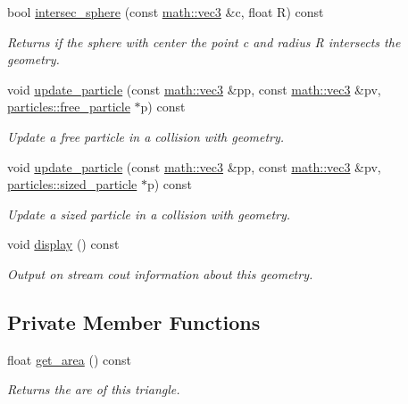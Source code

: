 \begin{DoxyCompactItemize}
bool \hyperlink{classphysim_1_1geometry_1_1triangle_aa5637d5f349e5cd1c774110b26854192}{intersec\+\_\+sphere} (const \hyperlink{structphysim_1_1math_1_1vec3}{math\+::vec3} \&c, float R) const
\begin{DoxyCompactList}\small\item\em Returns if the sphere with center the point {\itshape c} and radius {\itshape R} intersects the geometry. \end{DoxyCompactList}\item 
void \hyperlink{classphysim_1_1geometry_1_1triangle_a85898a3cca36efa410dfe9044619c798}{update\+\_\+particle} (const \hyperlink{structphysim_1_1math_1_1vec3}{math\+::vec3} \&pp, const \hyperlink{structphysim_1_1math_1_1vec3}{math\+::vec3} \&pv, \hyperlink{classphysim_1_1particles_1_1free__particle}{particles\+::free\+\_\+particle} $\ast$p) const
\begin{DoxyCompactList}\small\item\em Update a free particle in a collision with geometry. \end{DoxyCompactList}\item 
void \hyperlink{classphysim_1_1geometry_1_1triangle_a138bc267ef333128534651fa6f20ff2a}{update\+\_\+particle} (const \hyperlink{structphysim_1_1math_1_1vec3}{math\+::vec3} \&pp, const \hyperlink{structphysim_1_1math_1_1vec3}{math\+::vec3} \&pv, \hyperlink{classphysim_1_1particles_1_1sized__particle}{particles\+::sized\+\_\+particle} $\ast$p) const
\begin{DoxyCompactList}\small\item\em Update a sized particle in a collision with geometry. \end{DoxyCompactList}\item 
\mbox{\label{classphysim_1_1geometry_1_1triangle_a6f66065d251a306ea97a9ba7b80eaa0b}} 
void \hyperlink{classphysim_1_1geometry_1_1triangle_a6f66065d251a306ea97a9ba7b80eaa0b}{display} () const
\begin{DoxyCompactList}\small\item\em Output on stream {\itshape cout} information about this geometry. \end{DoxyCompactList}\end{DoxyCompactItemize}
\subsection*{Private Member Functions}
\begin{DoxyCompactItemize}
\item 
\mbox{\label{classphysim_1_1geometry_1_1triangle_aacff267a29d1080e1a367b6b0e5b352d}} 
float \hyperlink{classphysim_1_1geometry_1_1triangle_aacff267a29d1080e1a367b6b0e5b352d}{get\+\_\+area} () const
\begin{DoxyCompactList}\small\item\em Returns the are of this triangle. \end{DoxyCompactList}\end{DoxyCompactItemize}
